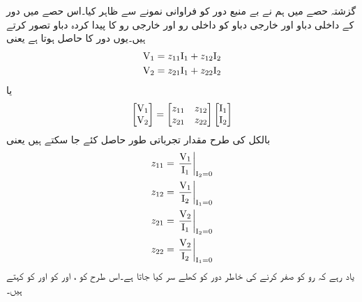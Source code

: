 گزشتہ حصے میں ہم نے بے منبع دور  کو فراوانی نمونے سے ظاہر کیا۔اس حصے میں دور کے داخلی دباو   اور خارجی دباو   کو داخلی رو  اور خارجی رو  کا پیدا کردہ دباو تصور کرتے ہیں۔یوں دور کا  حاصل ہوتا ہے یعنی  
\begin{gather}
\begin{aligned}\label{مساوات_چار_سر_رکاوٹی_الف}
{\ensuremath{{\textup{V}}}}_1&=z_{11}{{\textup{I}}}_1+z_{12}{{\textup{I}}}_2\\
{{\textup{V}}}_2&=z_{21} {{\textup{I}}}_1+z_{22} {{\textup{I}}}_2
\end{aligned}
\end{gather}
یا
\begin{align}\label{مساوات_نمونہ_رکاوٹی}
\begin{bmatrix}
{\ensuremath{{\textup{V}}}}_1\\
{{\textup{V}}}_2
\end{bmatrix}
=
\begin{bmatrix}
z_{11} & z_{12}\\
z_{21}& z_{22}
\end{bmatrix}
\begin{bmatrix}
{\ensuremath{{\textup{I}}}}_1\\
{{\textup{I}}}_2
\end{bmatrix}
\end{align}
بالکل  کی طرح  مقدار تجرباتی طور حاصل کئے جا سکتے ہیں یعنی
\begin{gather}
\begin{aligned} 
z_{11}&=\left. \frac{{{\textup{V}}}_1}{{{\textup{I}}}_1}\right|_{{{\textup{I}}}_2=0}\\
z_{12}&=\left. \frac{{{\textup{V}}}_1}{{{\textup{I}}}_2}\right|_{{{\textup{I}}}_1=0}\\
z_{21}&=\left. \frac{{{\textup{V}}}_2}{{{\textup{I}}}_1}\right|_{{{\textup{I}}}_2=0}\\
z_{22}&=\left. \frac{{{\textup{V}}}_2}{{{\textup{I}}}_2}\right|_{{{\textup{I}}}_1=0}
\end{aligned}
\end{gather}
یاد رہے کہ رو کو صفر کرنے کی خاطر دور کو کھلے سر کیا جاتا ہے۔اس طرح  کو ،  اور  کو  اور  کو  کہتے ہیں۔

